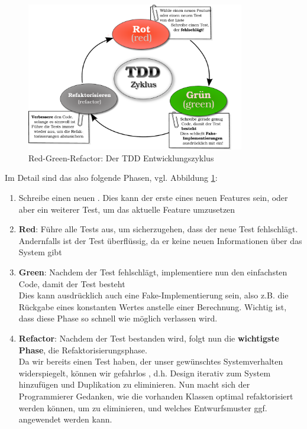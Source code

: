   \begin{figure}[htbp]
 \centering
 \includegraphics[width=0.85\textwidth]{./diagrams/red-green-refactor.pdf}
 \caption{Red-Green-Refactor: Der TDD Entwicklungszyklus}
  \label{fig:redgreenrefactor}
\end{figure}
  Im Detail sind das also folgende Phasen, vgl. Abbildung \ref{fig:redgreenrefactor}:
  \begin{enumerate}
   \item Schreibe einen neuen . Dies kann der erste eines neuen Features sein, oder aber ein weiterer Test, um das aktuelle Feature umzusetzen
   \item \textbf{Red}: Führe alle Tests aus, um sicherzugehen, dass der neue Test fehlschlägt. Andernfalls ist der Test überflüssig, da er keine neuen Informationen über das System gibt
   \item \textbf{Green}: Nachdem der Test fehlschlägt, implementiere nun den einfachsten Code, damit der Test besteht\\
   Dies kann ausdrücklich auch eine Fake-Implementierung sein, also z.B. die Rückgabe eines konstanten Wertes anstelle einer Berechnung. Wichtig ist, dass diese Phase so schnell wie möglich verlassen wird.
   \item \textbf{Refactor}: Nachdem der Test bestanden wird, folgt nun die \textbf{wichtigste Phase}, die Refaktorisierungsphase.\\
   Da wir bereits einen Test haben, der unser gewünschtes Systemverhalten widerspiegelt, können wir gefahrlos , d.h. Design iterativ zum System hinzufügen und Duplikation zu eliminieren. Nun macht sich der Programmierer Gedanken, wie die vorhanden Klassen optimal refaktorisiert werden können, um  zu eliminieren, und welches Entwurfsmuster ggf. angewendet werden kann.
  \end{enumerate}


